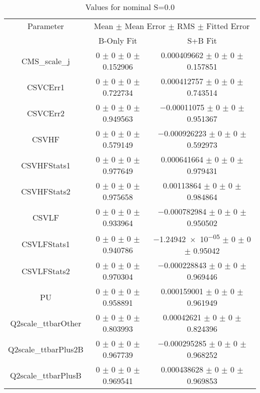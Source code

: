 \begin{table}
\centering
\caption{Values for nominal S=0.0}
\begin{tabular}{ccc}
\toprule
Parameter & \multicolumn{2}{c}{Mean $\pm$ Mean Error $\pm$ RMS $\pm$ Fitted Error}\\
 & B-Only Fit & S+B Fit\\
\midrule
CMS\_scale\_j & \num{0} $\pm$ \num{0} $\pm$ \num{0} $\pm$ \num{0.152906} & \num{0.000409662} $\pm$ \num{0} $\pm$ \num{0} $\pm$ \num{0.157851}\\
CSVCErr1 & \num{0} $\pm$ \num{0} $\pm$ \num{0} $\pm$ \num{0.722734} & \num{0.000412757} $\pm$ \num{0} $\pm$ \num{0} $\pm$ \num{0.743514}\\
CSVCErr2 & \num{0} $\pm$ \num{0} $\pm$ \num{0} $\pm$ \num{0.949563} & \num{-0.00011075} $\pm$ \num{0} $\pm$ \num{0} $\pm$ \num{0.951367}\\
CSVHF & \num{0} $\pm$ \num{0} $\pm$ \num{0} $\pm$ \num{0.579149} & \num{-0.000926223} $\pm$ \num{0} $\pm$ \num{0} $\pm$ \num{0.592973}\\
CSVHFStats1 & \num{0} $\pm$ \num{0} $\pm$ \num{0} $\pm$ \num{0.977649} & \num{0.000641664} $\pm$ \num{0} $\pm$ \num{0} $\pm$ \num{0.979431}\\
CSVHFStats2 & \num{0} $\pm$ \num{0} $\pm$ \num{0} $\pm$ \num{0.975658} & \num{0.00113864} $\pm$ \num{0} $\pm$ \num{0} $\pm$ \num{0.984864}\\
CSVLF & \num{0} $\pm$ \num{0} $\pm$ \num{0} $\pm$ \num{0.933964} & \num{-0.000782984} $\pm$ \num{0} $\pm$ \num{0} $\pm$ \num{0.950502}\\
CSVLFStats1 & \num{0} $\pm$ \num{0} $\pm$ \num{0} $\pm$ \num{0.940786} & \num{-1.24942e-05} $\pm$ \num{0} $\pm$ \num{0} $\pm$ \num{0.95042}\\
CSVLFStats2 & \num{0} $\pm$ \num{0} $\pm$ \num{0} $\pm$ \num{0.970304} & \num{-0.000228843} $\pm$ \num{0} $\pm$ \num{0} $\pm$ \num{0.969446}\\
PU & \num{0} $\pm$ \num{0} $\pm$ \num{0} $\pm$ \num{0.958891} & \num{0.000159001} $\pm$ \num{0} $\pm$ \num{0} $\pm$ \num{0.961949}\\
Q2scale\_ttbarOther & \num{0} $\pm$ \num{0} $\pm$ \num{0} $\pm$ \num{0.803993} & \num{0.00042621} $\pm$ \num{0} $\pm$ \num{0} $\pm$ \num{0.824396}\\
Q2scale\_ttbarPlus2B & \num{0} $\pm$ \num{0} $\pm$ \num{0} $\pm$ \num{0.967739} & \num{-0.000295285} $\pm$ \num{0} $\pm$ \num{0} $\pm$ \num{0.968252}\\
Q2scale\_ttbarPlusB & \num{0} $\pm$ \num{0} $\pm$ \num{0} $\pm$ \num{0.969541} & \num{0.000438628} $\pm$ \num{0} $\pm$ \num{0} $\pm$ \num{0.969853}\\

\end{tabular}
\end{table}
